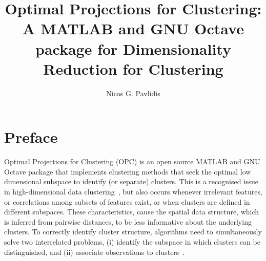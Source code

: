 \documentclass{book}
\title{Optimal Projections for Clustering: A MATLAB and GNU Octave package for Dimensionality Reduction for Clustering}
\author{Nicos G. Pavlidis}
\date{}
\def\mm#1{$#1$}
\begin{document}
\begin{htmlonly}
\def\href#1#2{\htmladdnormallink{#2}{#1}}
\def\mm#1{{\it #1}}
\end{htmlonly}

\maketitle
\tableofcontents

\chapter{Preface}

Optimal Projections for Clustering (OPC)
is an open source MATLAB and GNU Octave package that implements
clustering methods that seek the optimal low dimensional subspace to identify
(or separate) clusters.
%
This is a recognised issue in high-dimensional data
clustering~\cite{KriegelKZ2009}, but also occurs whenever irrelevant features,
or correlations among subsets of features exist, or when
clusters are defined in different subspaces. These characteristics, cause
the spatial data structure, which is inferred from pairwise distances, to be
less informative about the underlying clusters. To correctly identify cluster
structure, algorithms need to simultaneously solve two interrelated problems,
(i) identify the subspace in which clusters can be distinguished, and (ii)
associate observations to clusters~\cite{KriegelKZ2009}.
\end{document}
